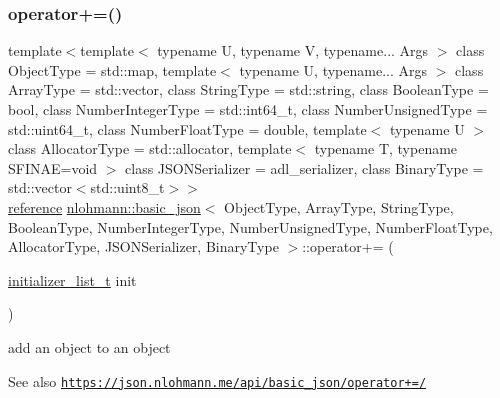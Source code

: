 \subsubsection{\texorpdfstring{operator+=()}{operator+=()}\hspace{0.1cm}{\footnotesize\ttfamily [4/4]}}
{\footnotesize\ttfamily template$<$template$<$ typename U, typename V, typename... Args $>$ class Object\+Type = std\+::map, template$<$ typename U, typename... Args $>$ class Array\+Type = std\+::vector, class String\+Type  = std\+::string, class Boolean\+Type  = bool, class Number\+Integer\+Type  = std\+::int64\+\_\+t, class Number\+Unsigned\+Type  = std\+::uint64\+\_\+t, class Number\+Float\+Type  = double, template$<$ typename U $>$ class Allocator\+Type = std\+::allocator, template$<$ typename T, typename S\+F\+I\+N\+A\+E=void $>$ class J\+S\+O\+N\+Serializer = adl\+\_\+serializer, class Binary\+Type  = std\+::vector$<$std\+::uint8\+\_\+t$>$$>$ \\
\hyperlink{classnlohmann_1_1basic__json_a220ae98554a76205fb7f8822d36b2d5a}{reference} \hyperlink{classnlohmann_1_1basic__json}{nlohmann\+::basic\+\_\+json}$<$ Object\+Type, Array\+Type, String\+Type, Boolean\+Type, Number\+Integer\+Type, Number\+Unsigned\+Type, Number\+Float\+Type, Allocator\+Type, J\+S\+O\+N\+Serializer, Binary\+Type $>$\+::operator+= (\begin{DoxyParamCaption}\item[{\hyperlink{classnlohmann_1_1basic__json_ac569f292a070dfd2f6b69c16e746095a}{initializer\+\_\+list\+\_\+t}}]{init }\end{DoxyParamCaption})\hspace{0.3cm}{\ttfamily [inline]}}



add an object to an object 

\begin{DoxySeeAlso}{See also}
\href{https://json.nlohmann.me/api/basic_json/operator+=/}{\tt https\+://json.\+nlohmann.\+me/api/basic\+\_\+json/operator+=/} 
\end{DoxySeeAlso}
\mbox{\label{classnlohmann_1_1basic__json_a1ae937c299f347a9dcb7f31a8e57762b}} 
